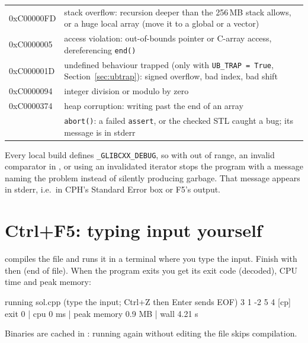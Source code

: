 \begin{center}
\begin{tabularx}{\linewidth}{>{\ttfamily}p{3.3cm}L}
\toprule
{} &  \\
\midrule
0xC00000FD & stack overflow: recursion deeper than the 256\,MB stack allows, or a huge local array (move it to a global or a vector) \\
0xC0000005 & access violation: out-of-bounds pointer or C-array access, dereferencing \texttt{end()} \\
0xC000001D & undefined behaviour trapped (only with \texttt{UB\_TRAP = True}, Section~\ref{sec:ubtrap}): signed overflow, bad index, bad shift \\
0xC0000094 & integer division or modulo by zero \\
0xC0000374 & heap corruption: writing past the end of an array \\
3 & \texttt{abort()}: a failed \texttt{assert}, or the checked STL caught a bug; its message is in stderr \\
\bottomrule
\end{tabularx}
\end{center}

\begin{fact}
Every local build defines \texttt{\_GLIBCXX\_DEBUG}, so  with  out of range, an invalid comparator in
, or using an invalidated iterator stops the program with a message naming the problem instead of
silently producing garbage. That message appears in stderr, i.e.\ in CPH's Standard Error box or F5's output.
\end{fact}

\section{Ctrl+F5: typing input yourself}

 compiles the file and runs it in a terminal where you type the input. Finish with  then
 (end of file). When the program exits you get its exit code (decoded), CPU time and peak memory:

\begin{shell}
[cp] running sol.cpp  (type the input; Ctrl+Z then Enter sends EOF)
3
1 -2 5
4
[cp] exit 0 | cpu 0 ms | peak memory 0.9 MB | wall 4.21 s
\end{shell}

Binaries are cached in : running again without editing the file skips compilation.

